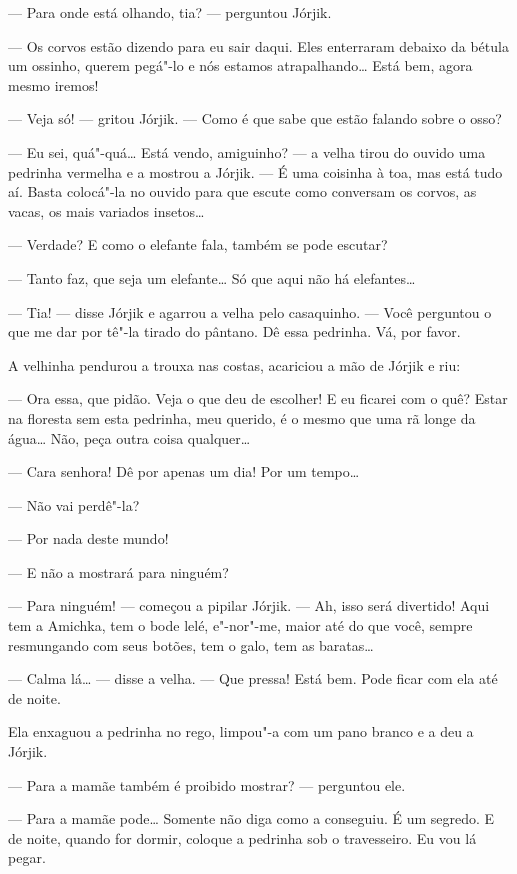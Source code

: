 --- Para onde está olhando, tia? --- perguntou Jórjik.

--- Os corvos estão dizendo para eu sair daqui. Eles enterraram debaixo
da bétula um ossinho, querem pegá"-lo e nós estamos atrapalhando\ldots{} Está
bem, agora mesmo iremos!

--- Veja só! --- gritou Jórjik. --- Como é que sabe que estão falando
sobre o osso?

--- Eu sei, quá"-quá\ldots{} Está vendo, amiguinho? --- a velha tirou do
ouvido uma pedrinha vermelha e a mostrou a Jórjik. --- É uma coisinha à
toa, mas está tudo aí. Basta colocá"-la no ouvido para que escute como
conversam os corvos, as vacas, os mais variados insetos\ldots{}

--- Verdade? E como o elefante fala, também se pode escutar?

--- Tanto faz, que seja um elefante\ldots{} Só que aqui não há elefantes\ldots{}

--- Tia! --- disse Jórjik e agarrou a velha pelo casaquinho. --- Você
perguntou o que me dar por tê"-la tirado do pântano. Dê essa pedrinha.
Vá, por favor.

A velhinha pendurou a trouxa nas costas, acariciou a mão de Jórjik e
riu:

--- Ora essa, que pidão. Veja o que deu de escolher! E eu ficarei com o
quê? Estar na floresta sem esta pedrinha, meu querido, é o mesmo que uma
rã longe da água\ldots{} Não, peça outra coisa qualquer\ldots{}

--- Cara senhora! Dê por apenas um dia! Por um tempo\ldots{}

--- Não vai perdê"-la?

--- Por nada deste mundo!

--- E não a mostrará para ninguém?

--- Para ninguém! --- começou a pipilar Jórjik. --- Ah, isso será
divertido! Aqui tem a Amichka, tem o bode lelé, e"-nor"-me, maior até do
que você, sempre resmungando com seus botões, tem o galo, tem as
baratas\ldots{}

--- Calma lá\ldots{} --- disse a velha. --- Que pressa! Está bem. Pode ficar
com ela até de noite.

Ela enxaguou a pedrinha no rego, limpou"-a com um pano branco e a deu a
Jórjik.

--- Para a mamãe também é proibido mostrar? --- perguntou ele.

--- Para a mamãe pode\ldots{} Somente não diga como a conseguiu. É um
segredo. E de noite, quando for dormir, coloque a pedrinha sob o
travesseiro. Eu vou lá pegar.

